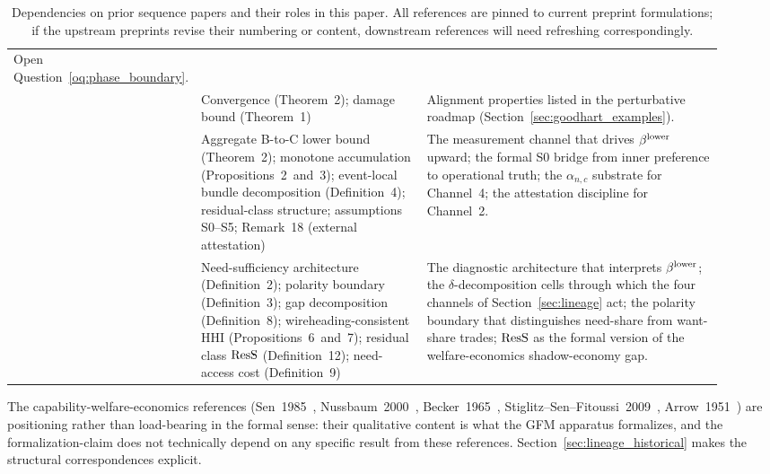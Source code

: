 \begin{table}[ht]
\begin{tabular}{>{\raggedright\arraybackslash}p{0.18\linewidth}
                >{\raggedright\arraybackslash}p{0.32\linewidth}
                >{\raggedright\arraybackslash}p{0.42\linewidth}}
Open Question~\ref{oq:phase_boundary}. \\
\addlinespace
\citep[Controlled Relaxation]{lasser2026wamura} &
Convergence (Theorem~2); damage bound (Theorem~1) &
Alignment properties listed in the perturbative roadmap
(Section~\ref{sec:goodhart_examples}). \\
\addlinespace
\citep[Revealed Sacrifice]{lasser2026paper8a} &
Aggregate B-to-C lower bound (Theorem~2); monotone accumulation
(Propositions~2~and~3); event-local bundle decomposition
(Definition~4); residual-class structure; assumptions
S0--S5; Remark~18 (external attestation) &
The measurement channel that drives $\beta^{\mathrm{lower}}$ upward; the formal
S0 bridge from inner preference to operational truth; the
$\alpha_{n,c}$ substrate for Channel~4; the attestation
discipline for Channel~2. \\
\addlinespace
\citep[Need Sufficiency]{lasser2026paper8b} &
Need-sufficiency architecture (Definition~2); polarity boundary
(Definition~3); gap decomposition (Definition~8);
wireheading-consistent HHI (Propositions~6~and~7); residual class
$\mathrm{ResS}$ (Definition~12); need-access cost (Definition~9) &
The diagnostic architecture that interprets $\beta^{\mathrm{lower}}$; the
$\delta$-decomposition cells through which the four channels
of Section~\ref{sec:lineage} act; the polarity boundary that
distinguishes need-share from want-share trades; $\mathrm{ResS}$ as
the formal version of the welfare-economics shadow-economy
gap. \\
\bottomrule
\end{tabular}
\caption{Dependencies on prior sequence papers and their roles
in this paper.  All references are pinned to current preprint
formulations; if the upstream preprints revise their numbering
or content, downstream references will need refreshing
correspondingly.}
\label{tab:dependencies}
\end{table}

The capability-welfare-economics references
(Sen~1985~\citep{sen1985commodities},
Nussbaum~2000~\citep{nussbaum2000women},
Becker~1965~\citep{becker1965theory},
Stiglitz--Sen--Fitoussi~2009~\citep{stiglitz2009report},
Arrow~1951~\citep{arrow1951social}) are positioning rather
than load-bearing in the formal sense: their qualitative
content is what the GFM apparatus formalizes, and the
formalization-claim does not technically depend on any specific
result from these references.  Section~\ref{sec:lineage_historical}
makes the structural correspondences explicit.
